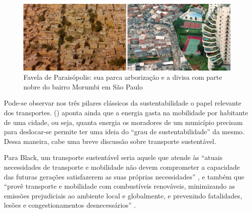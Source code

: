\begin{figure}[htb]%
    \caption{\label{fig:paraisopolis}Favela de Paraisópolis: sua parca arborização e a divisa com parte nobre do bairro Morumbi em São Paulo}%
    \begin{center}%
        \includegraphics[width=1.0\textwidth]{./imagens/paraisopolis.jpg}%
    \end{center}%
\end{figure}%

Pode-se observar nos três pilares clássicos da sustentabilidade o papel relevante dos transportes.  (\citeyear{VASCONCELLOS2012}) aponta ainda que a energia gasta na mobilidade por habitante de uma cidade, ou seja, quanta energia os moradores de um município precisam para deslocar-se permite ter uma ideia do ``grau de sustentabilidade'' da mesmo. Dessa maneira, cabe uma breve discussão sobre transporte sustentável.

Para Black, um transporte sustentável seria aquele que atende às ``atuais necessidades de transporte e mobilidade não devem comprometer a capacidade das futuras gerações satisfazerem as suas próprias necessidades'' \cite[p.151]{BLACK1996}, e também que ``provê transporte e mobilidade com combustíveis renováveis, minimizando as emissões prejudiciais ao ambiente local e globalmente, e prevenindo fatalidades, lesões e congestionamentos desnecessários'' \cite[p.12]{BLACK2010}.

